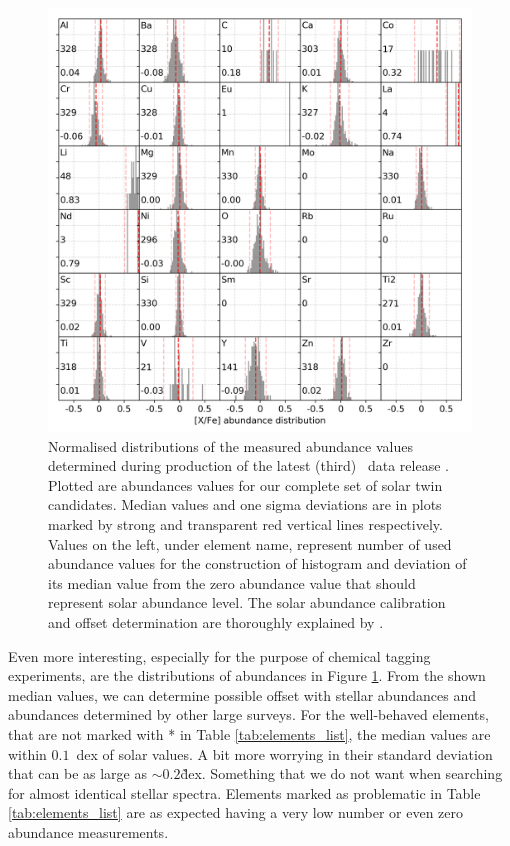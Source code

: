 \begin{figure}
	\centering
	\includegraphics[width=\textwidth]{abund_all_selection_ebv_c3.png}
	\caption{Normalised distributions of the measured abundance values determined during production of the latest (third) \Gh\ data release \protect\cite{buder2020}. Plotted are abundances values for our complete set of solar twin candidates. Median values and one sigma deviations are in plots marked by strong and transparent red vertical lines respectively. Values on the left, under element name, represent number of used abundance values for the construction of histogram and deviation of its median value from the zero abundance value that should represent solar abundance level. The solar abundance calibration and offset determination are thoroughly explained by \protect\citet{buder2020}.}
	\label{fig:abund_candidates}
\end{figure}

Even more interesting, especially for the purpose of chemical tagging experiments, are the distributions of abundances in Figure \ref{fig:abund_candidates}. From the shown median values, we can determine possible offset with stellar abundances and abundances determined by other large surveys. For the well-behaved elements, that are not marked with * in Table \ref{tab:elements_list}, the median values are within $0.1$~dex of solar values. A bit more worrying in their standard deviation that can be as large as $\sim0.2$\~dex. Something that we do not want when searching for almost identical stellar spectra. Elements marked as problematic in Table \ref{tab:elements_list} are as expected having a very low number or even zero abundance measurements.


